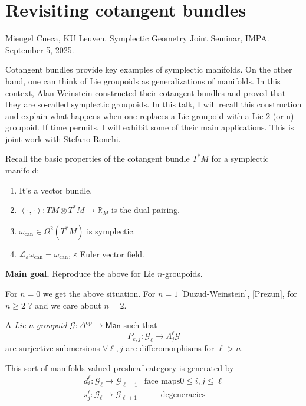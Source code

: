 \section{Revisiting cotangent bundles}
\label{section-revisiting-cotangent-bundles}

\noindent
Mieugel Cueca, KU Leuven.
Symplectic Geometry Joint Seminar, IMPA. 
September 5, 2025.

 Cotangent bundles provide key examples of symplectic
manifolds. On the other hand, one can think of Lie groupoids as generalizations
of manifolds. In this context, Alan Weinstein constructed their cotangent
bundles and proved that they are so-called symplectic groupoids. In this talk, I
will recall this construction and explain what happens when one replaces a Lie
groupoid with a Lie 2 (or n)-groupoid. If time permits, I will exhibit some of
their main applications. This is joint work with Stefano Ronchi.

\medskip\noindent

Recall the basic properties of the cotangent
bundle $T^*M$ for a symplectic manifold:
\begin{enumerate}
\item It's a vector bundle.
\item $\left<\cdot,\cdot\right>:TM \otimes T^*M \to \mathbb{R}_M$ 
is the dual pairing.
\item $\omega_{\text{can}}\in \Omega^2(T^*M)$ is symplectic.
\item $\mathcal{L}_\varepsilon \omega_{\text{can}}=\omega_{\text{can}}$,
$\varepsilon$ Euler vector field.
\end{enumerate}

\medskip\noindent
{\bf Main goal.} Reproduce the above for Lie $n$-groupoids.

For $n=0$ we get the above situation. For $n=1$ [Duzud-Weinstein], [Prezun],
for $n\geq 2$ ? and we care about $n=2$.

\begin{definition}
\label{definition-groupoid}
A {\it Lie $n$-groupoid} $\mathcal{G}:\Delta^{\text{op}}\to \mathsf{Man}$ 
such that
$$
P_{e,j}:\mathcal{G}_{\ell}\to \Lambda_j^\ell \mathcal{G}
$$
are surjective submersions $\forall  \ell,j$ 
are differomorphisms for $\ell > n$.
\end{definition}

\begin{remark}
\label{remark-generators}
This sort of manifolds-valued presheaf category is generated by
\begin{align*}
d_i^\ell:\mathcal{G}_\ell \to \mathcal{G}_{\ell-1}&\text{face maps}
0 \leq  i,j \leq  \ell\\
s_j^\ell:\mathcal{G}_\ell \to \mathcal{G}_{\ell+1}&  \qquad \text{degeneracies}
\end{align*}
\end{remark}

